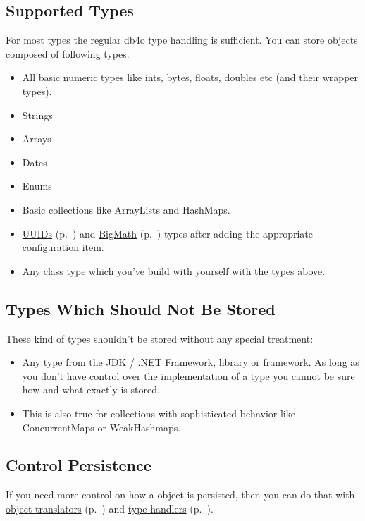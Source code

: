\subsection*{Supported Types}

For most types the regular db4o type handling is sufficient. You can store objects composed of following types:

\begin{itemize}
\item All basic numeric types like ints, bytes, floats, doubles etc (and their wrapper types).
\item Strings
\item Arrays
\item Dates
\item Enums
\item Basic collections like ArrayLists and HashMaps.
\item \hyperref[ref:advanced-topics-type-handling-uuid-support]{UUIDs} (p.~\pageref{ref:advanced-topics-type-handling-uuid-support}) and \hyperref[ref:advanced-topics-type-handling-bigmath]{BigMath} (p.~\pageref{ref:advanced-topics-type-handling-bigmath}) types after adding the appropriate configuration item.
\item Any class type which you've build with yourself with the types above.
\end{itemize}

\subsection*{Types Which Should Not Be Stored}

These kind of types shouldn't be stored without any special treatment:

\begin{itemize}
\item Any type from the JDK / .NET Framework, library or framework. As long as you don't have control over the implementation of a type you cannot be sure how and what exactly is stored.
\item This is also true for collections with sophisticated behavior like ConcurrentMaps or WeakHashmaps.
\end{itemize}

\subsection*{Control Persistence}

If you need more control on how a object is persisted, then you can do that with \hyperref[ref:advanced-topics-type-handling-translators]{object translators} (p.~\pageref{ref:advanced-topics-type-handling-translators}) and \hyperref[ref:advanced-topics-type-handling-typehandlers]{type handlers} (p.~\pageref{ref:advanced-topics-type-handling-typehandlers}).

